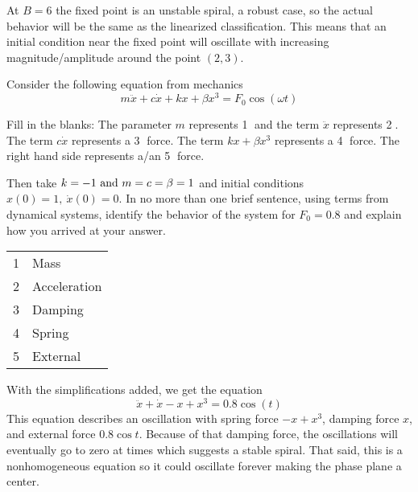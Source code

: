 \documentclass{article}
\begin{document}
\hangindent=20pt
\hspace*{20pt} At $B = 6$ the fixed point is an unstable spiral, a robust case, so the actual behavior will be the same as the linearized classification.  This means that an initial condition near the fixed point will oscillate with increasing magnitude/amplitude around the point $(2, 3)$.
\pagebreak

\newline Consider the following equation from mechanics
\[
m\ddot{x} + c\dot{x} + kx + \beta x^3 = F_0\cos{(\omega t)}
\]

Fill in the blanks:  The parameter $m$ represents \textcircled{1} and the term $\ddot{x}$ represents \textcircled{2}.  The term $c\dot{x}$ represents a \textcircled{3} force.  The term $kx + \beta x^3$ represents a \textcircled{4} force.  The right hand side represents a/an \textcircled{5} force.

\vspace{1em}

Then take $k = -1 \hbox{ and } m = c = \beta = 1$ and initial conditions $x(0) = 1, ~ \dot{x}(0) = 0$.  In no more than one brief sentence, using terms from dynamical systems, identify the behavior of the system for $F_0 = 0.8$ and explain how you arrived at your answer.

\hangindent=20pt
\vspace{10pt}
\newline \begin{tabular}{ll}
1 & Mass \\
2 & Acceleration \\
3 & Damping \\
4 & Spring \\
5 & External \\
\end{tabular}

\hangindent=20pt
\hspace*{20pt} With the simplifications added, we get the equation
\[
\ddot{x} + \dot{x} - x + x^3 = 0.8\cos{(t)}
\]
This equation describes an oscillation with spring force $-x + x^3$, damping force $x$, and external force $0.8\cos{t}$.  Because of that damping force, the oscillations will eventually go to zero at times which suggests a stable spiral.  That said, this is a nonhomogeneous equation so it could oscillate forever making the phase plane a center.
\pagebreak
\end{document}
